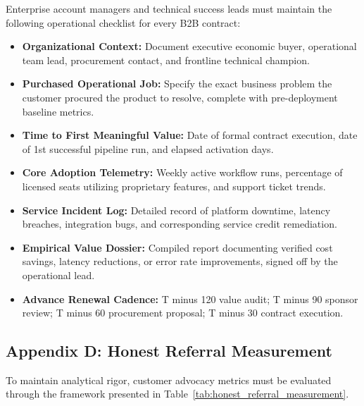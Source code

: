 Enterprise account managers and technical success leads must maintain the following operational checklist for every B2B contract:
\begin{itemize}[leftmargin=*]
\item \textbf{Organizational Context:} Document executive economic buyer, operational team lead, procurement contact, and frontline technical champion.
\item \textbf{Purchased Operational Job:} Specify the exact business problem the customer procured the product to resolve, complete with pre-deployment baseline metrics.
\item \textbf{Time to First Meaningful Value:} Date of formal contract execution, date of 1st successful pipeline run, and elapsed activation days.
\item \textbf{Core Adoption Telemetry:} Weekly active workflow runs, percentage of licensed seats utilizing proprietary features, and support ticket trends.
\item \textbf{Service Incident Log:} Detailed record of platform downtime, latency breaches, integration bugs, and corresponding service credit remediation.
\item \textbf{Empirical Value Dossier:} Compiled report documenting verified cost savings, latency reductions, or error rate improvements, signed off by the operational lead.
\item \textbf{Advance Renewal Cadence:} T minus 120 value audit; T minus 90 sponsor review; T minus 60 procurement proposal; T minus 30 contract execution.
\end{itemize}

\subsection*{Appendix D: Honest Referral Measurement}

To maintain analytical rigor, customer advocacy metrics must be evaluated through the framework presented in Table~\ref{tab:honest_referral_measurement}.

